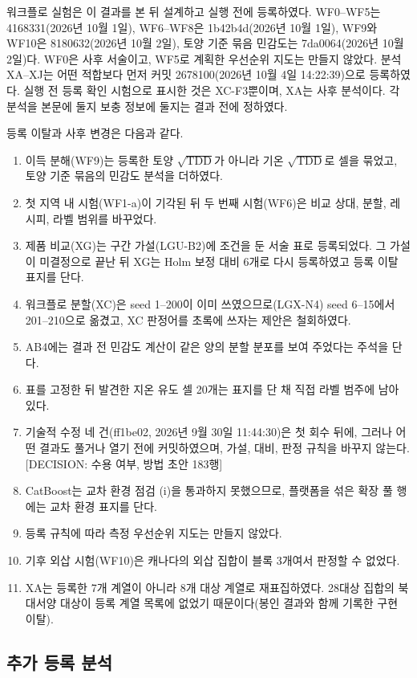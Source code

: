 워크플로 실험은 이 결과를 본 뒤 설계하고 실행 전에 등록하였다. WF0--WF5는 4168331(2026년 10월 1일), WF6--WF8은 1b42b4d(2026년 10월 1일), WF9와 WF10은 8180632(2026년 10월 2일), 토양 기준 묶음 민감도는 7da0064(2026년 10월 2일)다. WF0은 사후 서술이고, WF5로 계획한 우선순위 지도는 만들지 않았다. 분석 XA--XJ는 어떤 적합보다 먼저 커밋 2678100(2026년 10월 4일 14:22:39)으로 등록하였다. 실행 전 등록 확인 시험으로 표시한 것은 XC-F3뿐이며, XA는 사후 분석이다. 각 분석을 본문에 둘지 보충 정보에 둘지는 결과 전에 정하였다.

등록 이탈과 사후 변경은 다음과 같다.
\begin{enumerate}
\item 이득 분해(WF9)는 등록한 토양 $\sqrt{\mathrm{TDD}}$가 아니라 기온 $\sqrt{\mathrm{TDD}}$로 셀을 묶었고, 토양 기준 묶음의 민감도 분석을 더하였다.
\item 첫 지역 내 시험(WF1-a)이 기각된 뒤 두 번째 시험(WF6)은 비교 상대, 분할, 레시피, 라벨 범위를 바꾸었다.
\item 제품 비교(XG)는 구간 가설(LGU-B2)에 조건을 둔 서술 표로 등록되었다. 그 가설이 미결정으로 끝난 뒤 XG는 Holm 보정 대비 6개로 다시 등록하였고 등록 이탈 표지를 단다.
\item 워크플로 분할(XC)은 seed 1--200이 이미 쓰였으므로(LGX-N4) seed 6--15에서 201--210으로 옮겼고, XC 판정어를 초록에 쓰자는 제안은 철회하였다.
\item AB4에는 결과 전 민감도 계산이 같은 양의 분할 분포를 보여 주었다는 주석을 단다.
\item 표를 고정한 뒤 발견한 지온 유도 셀 20개는 표지를 단 채 직접 라벨 범주에 남아 있다.
\item 기술적 수정 네 건(ff1be02, 2026년 9월 30일 11:44:30)은 첫 회수 뒤에, 그러나 어떤 결과도 풀거나 열기 전에 커밋하였으며, 가설, 대비, 판정 규칙을 바꾸지 않는다. [DECISION: 수용 여부, 방법 초안 183행]
\item CatBoost는 교차 환경 점검 (i)을 통과하지 못했으므로, 플랫폼을 섞은 확장 풀 행에는 교차 환경 표지를 단다.
\item 등록 규칙에 따라 측정 우선순위 지도는 만들지 않았다.
\item 기후 외삽 시험(WF10)은 캐나다의 외삽 집합이 블록 3개여서 판정할 수 없었다.
\item XA는 등록한 7개 계열이 아니라 8개 대상 계열로 재표집하였다. 28대상 집합의 북대서양 대상이 등록 계열 목록에 없었기 때문이다(봉인 결과와 함께 기록한 구현 이탈).
\end{enumerate}

\subsection{추가 등록 분석}\label{sec:m-xbatch}

